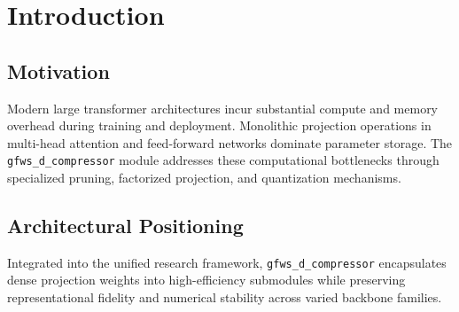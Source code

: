 \section{Introduction}

\subsection{Motivation}
Modern large transformer architectures incur substantial compute and memory overhead during training and deployment. Monolithic projection operations in multi-head attention and feed-forward networks dominate parameter storage. The \texttt{gfws_d_compressor} module addresses these computational bottlenecks through specialized pruning, factorized projection, and quantization mechanisms.

\subsection{Architectural Positioning}
Integrated into the unified research framework, \texttt{gfws_d_compressor} encapsulates dense projection weights into high-efficiency submodules while preserving representational fidelity and numerical stability across varied backbone families.
